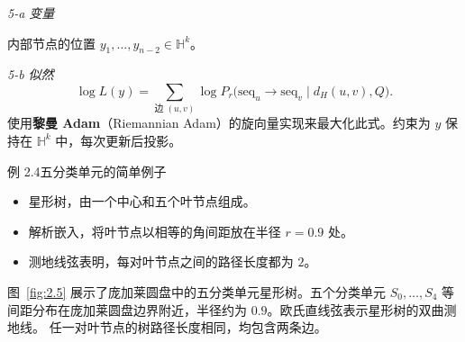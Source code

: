 \emph{5-a \quad 变量}

内部节点的位置 $y_1,\ldots,y_{n-2}\in\mathbb H^k$。

\emph{5-b \quad 似然}
\[
  \log L(y)=\sum_{\text{边 }(u,v)}
     \log P_r\bigl(\mathrm{seq}_u\to\mathrm{seq}_v\mid d_H(u,v),Q\bigr).
\]
使用\textbf{黎曼 Adam}（Riemannian Adam）的旋向量实现来最大化此式。约束为 $y$ 保持在 $\mathbb H^k$ 中，每次更新后投影。

\begin{statement}{例 2.4}{五分类单元的简单例子}
\begin{itemize}
  \item 星形树，由一个中心和五个叶节点组成。
  \item 解析嵌入，将叶节点以相等的角间距放在半径 $r=0.9$ 处。
  \item 测地线弦表明，每对叶节点之间的路径长度都为 $2$。
\end{itemize}

图~\ref{fig:2.5} 展示了庞加莱圆盘中的五分类单元星形树。五个分类单元 $S_0,\ldots,S_4$ 等间距分布在庞加莱圆盘边界附近，半径约为 $0.9$。欧氏直线弦表示星形树的双曲测地线。 任一对叶节点的树路径长度相同，均包含两条边。
\end{statement}
